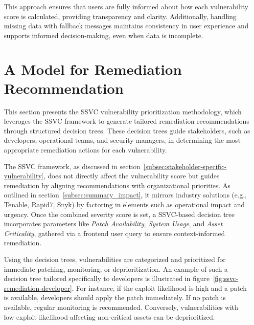 This approach ensures that users are fully informed about how each vulnerability score is calculated, providing transparency and clarity. Additionally, handling missing data with fallback messages maintains consistency in user experience and supports informed decision-making, even when data is incomplete.

\section{A Model for Remediation Recommendation}
\label{sec:remediation_recommendation}

This section presents the \ac{SSVC} vulnerability prioritization methodology, which leverages the \ac{SSVC} framework to generate tailored remediation recommendations through structured decision trees. These decision trees guide stakeholders, such as developers, operational teams, and security managers, in determining the most appropriate remediation actions for each vulnerability.

The \ac{SSVC} framework, as discussed in section~\ref{subsec:stakeholder-specific-vulnerability}, does not directly affect the vulnerability score but guides remediation by aligning recommendations with organizational priorities. As outlined in section~\ref{subsec:summary_impact}, it mirrors industry solutions (e.g., Tenable, Rapid7, Snyk) by factoring in elements such as operational impact and urgency. Once the combined severity score is set, a \ac{SSVC}-based decision tree incorporates parameters like \emph{Patch Availability}, \emph{System Usage}, and \emph{Asset Criticality}, gathered via a frontend user query to ensure context-informed remediation. 

Using the decision trees, vulnerabilities are categorized and prioritized for immediate patching, monitoring, or deprioritization. An example of such a decision tree tailored specifically to developers is illustrated in figure~\ref{fig:ssvc-remediation-developer}. For instance, if the exploit likelihood is high and a patch is available, developers should apply the patch immediately. If no patch is available, regular monitoring is recommended. Conversely, vulnerabilities with low exploit likelihood affecting non-critical assets can be deprioritized.

